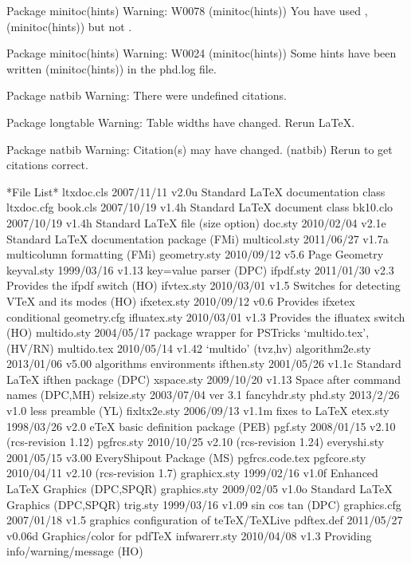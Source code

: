 
Package minitoc(hints) Warning: W0078
(minitoc(hints))                You have used \dominitoc, 
(minitoc(hints))                but not \minitoc.


Package minitoc(hints) Warning: W0024
(minitoc(hints))                Some hints have been written 
(minitoc(hints))                in the phd.log file.


Package natbib Warning: There were undefined citations.


Package longtable Warning: Table widths have changed. Rerun LaTeX.


Package natbib Warning: Citation(s) may have changed.
(natbib)                Rerun to get citations correct.


 *File List*
  ltxdoc.cls    2007/11/11 v2.0u Standard LaTeX documentation class
  ltxdoc.cfg
    book.cls    2007/10/19 v1.4h Standard LaTeX document class
    bk10.clo    2007/10/19 v1.4h Standard LaTeX file (size option)
     doc.sty    2010/02/04 v2.1e Standard LaTeX documentation package (FMi)
multicol.sty    2011/06/27 v1.7a multicolumn formatting (FMi)
geometry.sty    2010/09/12 v5.6 Page Geometry
  keyval.sty    1999/03/16 v1.13 key=value parser (DPC)
   ifpdf.sty    2011/01/30 v2.3 Provides the ifpdf switch (HO)
  ifvtex.sty    2010/03/01 v1.5 Switches for detecting VTeX and its modes (HO)
 ifxetex.sty    2010/09/12 v0.6 Provides ifxetex conditional
geometry.cfg
ifluatex.sty    2010/03/01 v1.3 Provides the ifluatex switch (HO)
 multido.sty    2004/05/17 package wrapper for PSTricks `multido.tex', (HV/RN)
 multido.tex    2010/05/14 v1.42 `multido' (tvz,hv)
algorithm2e.sty    2013/01/06 v5.00 algorithms environments
  ifthen.sty    2001/05/26 v1.1c Standard LaTeX ifthen package (DPC)
  xspace.sty    2009/10/20 v1.13 Space after command names (DPC,MH)
 relsize.sty    2003/07/04 ver 3.1
fancyhdr.sty    
     phd.sty    2013/2/26 v1.0 less preamble (YL)
fixltx2e.sty    2006/09/13 v1.1m fixes to LaTeX
    etex.sty    1998/03/26 v2.0 eTeX basic definition package (PEB)
     pgf.sty    2008/01/15 v2.10 (rcs-revision 1.12)
  pgfrcs.sty    2010/10/25 v2.10 (rcs-revision 1.24)
everyshi.sty    2001/05/15 v3.00 EveryShipout Package (MS)
  pgfrcs.code.tex
 pgfcore.sty    2010/04/11 v2.10 (rcs-revision 1.7)
graphicx.sty    1999/02/16 v1.0f Enhanced LaTeX Graphics (DPC,SPQR)
graphics.sty    2009/02/05 v1.0o Standard LaTeX Graphics (DPC,SPQR)
    trig.sty    1999/03/16 v1.09 sin cos tan (DPC)
graphics.cfg    2007/01/18 v1.5 graphics configuration of teTeX/TeXLive
  pdftex.def    2011/05/27 v0.06d Graphics/color for pdfTeX
infwarerr.sty    2010/04/08 v1.3 Providing info/warning/message (HO)
